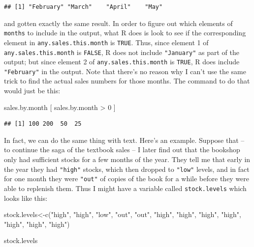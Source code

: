 \documentclass[
]{book}
\newenvironment{Shaded}{\begin{snugshade}}{\end{snugshade}}
\newcommand{\DecValTok}[1]{\textcolor[rgb]{0.00,0.00,0.81}{#1}}
\newcommand{\FunctionTok}[1]{\textcolor[rgb]{0.00,0.00,0.00}{#1}}
\newcommand{\NormalTok}[1]{#1}
\newcommand{\OtherTok}[1]{\textcolor[rgb]{0.56,0.35,0.01}{#1}}
\newcommand{\SpecialCharTok}[1]{\textcolor[rgb]{0.00,0.00,0.00}{#1}}
\newcommand{\StringTok}[1]{\textcolor[rgb]{0.31,0.60,0.02}{#1}}
\begin{document}
\begin{verbatim}
## [1] "February" "March"    "April"    "May"
\end{verbatim}

and gotten exactly the same result. In order to figure out which elements of \texttt{months} to include in the output, what R does is look to see if the corresponding element in \texttt{any.sales.this.month} is \texttt{TRUE}. Thus, since element 1 of \texttt{any.sales.this.month} is \texttt{FALSE}, R does not include \texttt{"January"} as part of the output; but since element 2 of \texttt{any.sales.this.month} is \texttt{TRUE}, R does include \texttt{"February"} in the output. Note that there's no reason why I can't use the same trick to find the actual sales numbers for those months. The command to do that would just be this:

\begin{Shaded}
\begin{Highlighting}[]
\NormalTok{sales.by.month [ sales.by.month }\SpecialCharTok{\textgreater{}} \DecValTok{0}\NormalTok{ ]}
\end{Highlighting}
\end{Shaded}

\begin{verbatim}
## [1] 100 200  50  25
\end{verbatim}

In fact, we can do the same thing with text. Here's an example. Suppose that -- to continue the saga of the textbook sales -- I later find out that the bookshop only had sufficient stocks for a few months of the year. They tell me that early in the year they had \texttt{"high"} stocks, which then dropped to \texttt{"low"} levels, and in fact for one month they were \texttt{"out"} of copies of the book for a while before they were able to replenish them. Thus I might have a variable called \texttt{stock.levels} which looks like this:

\begin{Shaded}
\begin{Highlighting}[]
\NormalTok{stock.levels}\OtherTok{\textless{}{-}}\FunctionTok{c}\NormalTok{(}\StringTok{"high"}\NormalTok{, }\StringTok{"high"}\NormalTok{, }\StringTok{"low"}\NormalTok{, }\StringTok{"out"}\NormalTok{, }\StringTok{"out"}\NormalTok{, }\StringTok{"high"}\NormalTok{,}
                \StringTok{"high"}\NormalTok{, }\StringTok{"high"}\NormalTok{, }\StringTok{"high"}\NormalTok{, }\StringTok{"high"}\NormalTok{, }\StringTok{"high"}\NormalTok{, }\StringTok{"high"}\NormalTok{)}

\NormalTok{stock.levels}
\end{Highlighting}
\end{Shaded}
\end{document}
